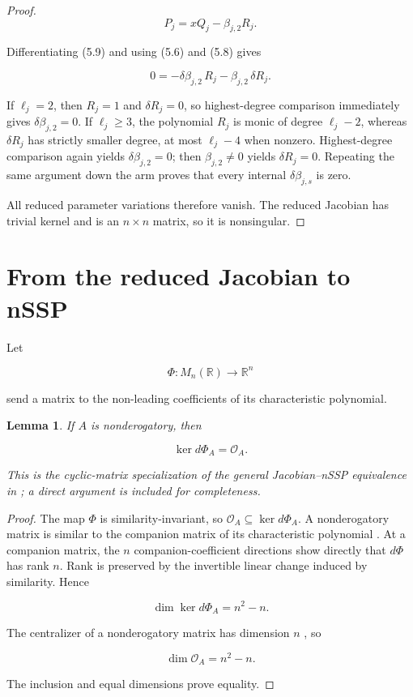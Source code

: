 \documentclass[11pt]{article}
\newtheorem{lemma}[theorem]{Lemma}
\theoremstyle{remark}
\begin{document}
\begin{proof}
\[
P_j=xQ_j-\beta_{j,2}R_j.
\tag{5.9}
\]

Differentiating (5.9) and using (5.6) and (5.8) gives

\[
0=-\delta\beta_{j,2}\,R_j-\beta_{j,2}\,\delta R_j.
\]

If $\ell_j=2$, then $R_j=1$ and $\delta R_j=0$, so highest-degree comparison immediately gives $\delta\beta_{j,2}=0$. If $\ell_j\ge3$, the polynomial $R_j$ is monic of degree $\ell_j-2$, whereas $\delta R_j$ has strictly smaller degree, at most $\ell_j-4$ when nonzero. Highest-degree comparison again yields $\delta\beta_{j,2}=0$; then $\beta_{j,2}\ne0$ yields $\delta R_j=0$. Repeating the same argument down the arm proves that every internal $\delta\beta_{j,s}$ is zero.

All reduced parameter variations therefore vanish. The reduced Jacobian has trivial kernel and is an $n\times n$ matrix, so it is nonsingular.
\end{proof}

\section{From the reduced Jacobian to nSSP}

Let

\[
\Phi:M_n(\mathbb R)\longrightarrow\mathbb R^n
\]

send a matrix to the non-leading coefficients of its characteristic polynomial.

\begin{lemma}

If $A$ is nonderogatory, then

\[
\ker d\Phi_A=\mathcal O_A.
\]

This is the cyclic-matrix specialization of the general Jacobian--nSSP equivalence in \cite[Theorem 5.1]{ref2}; a direct argument is included for completeness.
\end{lemma}

\begin{proof}

The map $\Phi$ is similarity-invariant, so $\mathcal O_A\subseteq\ker d\Phi_A$. A nonderogatory matrix is similar to the companion matrix of its characteristic polynomial \cite{ref9}. At a companion matrix, the $n$ companion-coefficient directions show directly that $d\Phi$ has rank $n$. Rank is preserved by the invertible linear change induced by similarity. Hence

\[
\dim\ker d\Phi_A=n^2-n.
\]

The centralizer of a nonderogatory matrix has dimension $n$ \cite{ref9}, so

\[
\dim\mathcal O_A=n^2-n.
\]

The inclusion and equal dimensions prove equality.
\end{proof}
\end{document}

